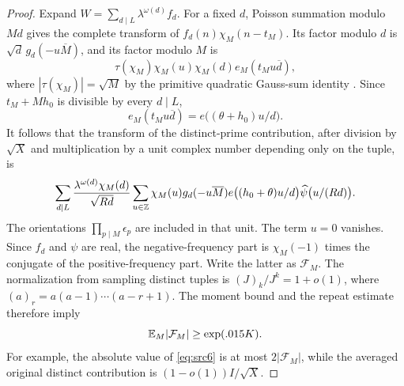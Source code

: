 \begin{proof}
Expand $W=\sum_{d\mid L}\lambda^{\omega(d)}f_d$.
For a fixed $d$, Poisson summation modulo $Md$ gives the complete
transform of $f_d(n)\chi_M(n-t_M)$.  Its factor modulo $d$ is
$\sqrt d\,g_d(-u\overline M)$, and its factor modulo $M$ is
\[
 \tau(\chi_M)\chi_M(u)\chi_M(d)
       e_M(t_Mu\overline d),
\]
where $|\tau(\chi_M)|=\sqrt M$ by the primitive quadratic Gauss-sum
identity \cite[Theorems~9.6--9.7]{MontgomeryVaughan2007}.
Since $t_M+Mh_0$ is divisible by every $d\mid L$,
\[
 e_M(t_Mu\overline d)=e\bigl((\theta+h_0)u/d\bigr).
\]
It follows that the transform of the distinct-prime contribution,
after division by $\sqrt X$ and multiplication by a unit complex
number depending only on the tuple, is
\begin{equation}\label{eq:src6}
 \sum_{d\mid L}\frac{\lambda^{\omega(d)}\chi_M(d)}{\sqrt{Rd}}
 \sum_{u\in\mathbb Z}\chi_M(u)g_d(-u\overline M)
       e\bigl((h_0+\theta)u/d\bigr)
       \widehat\psi\bigl(u/(Rd)\bigr).
\end{equation}
The orientations $\prod_{p\mid M}\epsilon_p$ are included in that
unit.  The term $u=0$ vanishes.  Since $f_d$ and $\psi$ are real,
the negative-frequency part is $\chi_M(-1)$ times the conjugate of
the positive-frequency part.  Write the latter as $\mathcal F_M$.
The normalization from sampling distinct tuples is
$(J)_k/J^k=1+o(1)$, where $(a)_r=a(a-1)\cdots(a-r+1)$.
The moment bound and the repeat estimate therefore imply
\begin{equation}\label{eq:quad-fourier-lower}
 \mathbb E_M|\mathcal F_M|\geq\exp(.015K).
\end{equation}
For example, the absolute value of \eqref{eq:src6} is at most
$2|\mathcal F_M|$, while the averaged original distinct contribution
is $(1-o(1))I/\sqrt X$.


\end{proof}
